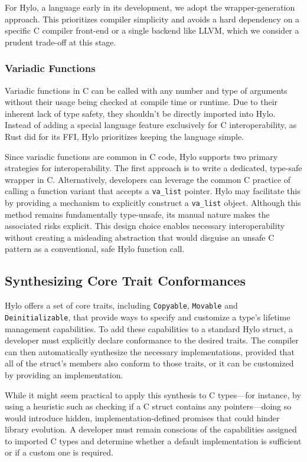 For Hylo, a language early in its development, we adopt the wrapper-generation approach. This prioritizes compiler simplicity and avoids a hard dependency on a specific C compiler front-end or a single backend like LLVM, which we consider a prudent trade-off at this stage.


\subsubsection{Variadic Functions}
Variadic functions in C can be called with any number and type of arguments without their usage being checked at compile time or runtime. Due to their inherent lack of type safety, they shouldn't be directly imported into Hylo. Instead of adding a special language feature exclusively for C interoperability, as Rust did for its FFI\cite{rust-variadic-ffi}, Hylo prioritizes keeping the language simple.

Since variadic functions are common in C code, Hylo supports two primary strategies for interoperability. The first approach is to write a dedicated, type-safe wrapper in C. Alternatively, developers can leverage the common C practice of calling a function variant that accepts a \texttt{va\_list} pointer\cite{wrapping-valist}. Hylo may facilitate this by providing a mechanism to explicitly construct a \texttt{va\_list} object\cite{swift-variadic-ffi}. Although this method remains fundamentally type-unsafe, its manual nature makes the associated risks explicit. This design choice enables necessary interoperability without creating a misleading abstraction that would disguise an unsafe C pattern as a conventional, safe Hylo function call.

\subsection{Synthesizing Core Trait Conformances}

Hylo offers a set of core traits, including \texttt{Copyable}, \texttt{Movable} and \texttt{Deinitializable}, that provide ways to specify and customize a type's lifetime management capabilities. To add these capabilities to a standard Hylo struct, a developer must explicitly declare conformance to the desired traits. The compiler can then automatically synthesize the necessary implementations, provided that all of the struct's members also conform to those traits, or it can be customized by providing an implementation.

While it might seem practical to apply this synthesis to C types—for instance, by using a heuristic such as checking if a C struct contains any pointers—doing so would introduce hidden, implementation-defined promises that could hinder library evolution. A developer must remain conscious of the capabilities assigned to imported C types and determine whether a default implementation is sufficient or if a custom one is required.

